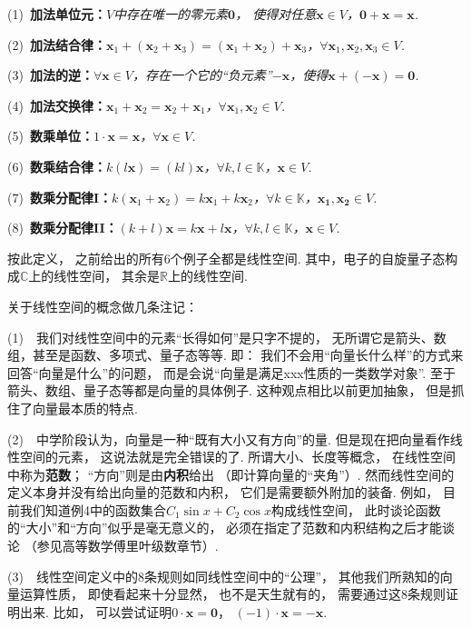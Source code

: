 (1)~\textbf{加法单位元：}\textit{$V$中存在唯一的零元素$\bm{0}$，
使得对任意$\bm{x} \in V$，$\bm{0} + \bm{x} = \bm{x}$. }

(2)~\textbf{加法结合律：}\textit{$\bm{x}_1 +( \bm{x}_2 + \bm{x}_3) = (\bm{x}_1 + \bm{x}_2) + \bm{x}_3$，$\forall \bm{x}_1,\bm{x}_2, \bm{x}_3 \in V$.}

(3)~\textbf{加法的逆：}\textit{$\forall \bm{x} \in V$，存在一个它的“负元素”$-\bm{x}$，使得$\bm{x}+(-\bm{x}) = \bm{0}$.}

(4)~\textbf{加法交换律：}\textit{$\bm{x}_1 + \bm{x}_2 = \bm{x}_2 + \bm{x}_1$，$\forall \bm{x}_1,\bm{x}_2 \in V$.}

(5)~\textbf{数乘单位：}\textit{$1 \cdot \bm{x} = \bm{x}$，$\forall \bm{x} \in V$.}

(6)~\textbf{数乘结合律：}\textit{$k(l \bm{x}) = (kl)\bm{x}$，$\forall k,l \in \mathbb{K}$，$\bm{x} \in V$.}

(7)~\textbf{数乘分配律I：}\textit{$k (\bm{x}_1 + \bm{x}_2) = k \bm{x}_1 + k \bm{x}_2$，$\forall k \in \mathbb{K}$，$\bm{x_1},\bm{x_2} \in V$.}

(8)~\textbf{数乘分配律II：}\textit{$(k+l)\bm{x} = k \bm{x} + l \bm{x}$，$\forall k,l \in \mathbb{K}$，$\bm{x} \in V$.}\medskip

按此定义，
之前给出的所有$6$个例子全都是线性空间.
其中，电子的自旋量子态构成$\mathbb{C}$上的线性空间，
其余是$\mathbb{R}$上的线性空间.

关于线性空间的概念做几条注记：
\medskip

(1)~~我们对线性空间中的元素“长得如何”是只字不提的，
无所谓它是箭头、数组，甚至是函数、多项式、量子态等等.
即：
我们不会用“向量长什么样”的方式来回答“向量是什么”的问题，
而是会说“向量是满足xxx性质的一类数学对象”.
至于箭头、数组、量子态等都是向量的具体例子.
这种观点相比以前更加抽象，
但是抓住了向量最本质的特点.

(2)~~中学阶段认为，向量是一种“既有大小又有方向”的量.
但是现在把向量看作线性空间的元素，
这说法就是完全错误的了.
所谓大小、长度等概念，
在线性空间中称为\textbf{范数}；
“方向”则是由\textbf{内积}给出
（即计算向量的“夹角”）.
然而线性空间的定义本身并没有给出向量的范数和内积，
它们是需要额外附加的装备.
例如，
目前我们知道例4中的函数集合$C_1 \sin x + C_2 \cos x$构成线性空间，
此时谈论函数的“大小”和“方向”似乎是毫无意义的，
必须在指定了范数和内积结构之后才能谈论
（参见高等数学傅里叶级数章节）.

(3)~~线性空间定义中的$8$条规则如同线性空间中的“公理”，
其他我们所熟知的向量运算性质，
即使看起来十分显然，
也不是天生就有的，
需要通过这$8$条规则证明出来.
比如，
可以尝试证明$0 \cdot \bm{x} = \bm{0}$，
$(-1) \cdot \bm{x} = -\bm{x}$.

